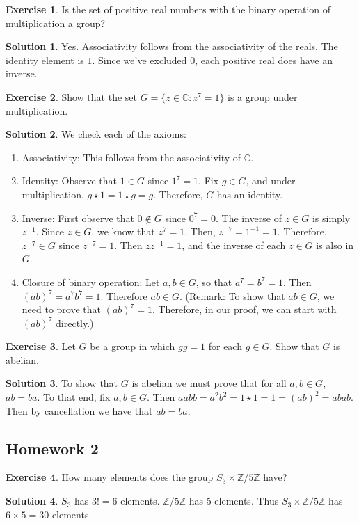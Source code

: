 \documentclass[12pt]{article}
\theoremstyle{definition}
\newcommand{\Z}{\mathbb{Z}}
\newtheorem{exercise}{\color{YellowOrange}Exercise}
\theoremstyle{definition}
\newtheorem{solution}{\color{Goldenrod}Solution}
\begin{document}
\begin{exercise}
Is the set of positive real numbers with the binary operation of multiplication a group?
\end{exercise}
\begin{solution}
Yes. Associativity follows from the associativity of the reals. The identity element is $1$. Since we've excluded $0$, each positive real does have an inverse.
\end{solution}

\begin{exercise}
Show that the set $G = \{z \in \mathbb{C}: z^7 = 1\}$ is a group under multiplication.
\end{exercise}
\begin{solution}
We check each of the axioms:
\begin{enumerate}
\item Associativity: This follows from the associativity of $\mathbb{C}$.
\item Identity: Observe that $1 \in G$ since $1^7 = 1$. Fix $g \in G$, and under multiplication, $g \star 1 = 1 \star g = g$. Therefore, $G$ has an identity.
\item Inverse: First observe that $0 \not\in G$ since $0^7 = 0$. The inverse of $z \in G$ is simply $z^{-1}$. Since $z \in G$, we know that $z^7 = 1$. Then, $z^{-7} = 1^{-1} = 1$. Therefore, $z^{-7} \in G$ since $z^{-7} = 1$. Then $z z^{-1} = 1$, and the inverse of each $z \in G$ is also in $G$.
\item Closure of binary operation: Let $a,b \in G$, so that $a^7 = b^7 = 1$. Then $(ab)^7 = a^7 b^7 = 1$. Therefore $ab \in G$. (Remark: To show that $ab \in G$, we need to prove that $(ab)^7 = 1$. Therefore, in our proof, we can start with $(ab)^7$ directly.)
\end{enumerate}
\end{solution}

\begin{exercise}
Let $G$ be a group in which $gg = 1$ for each $g \in G$. Show that $G$ is abelian.
\end{exercise}
\begin{solution}
To show that $G$ is abelian we must prove that for all $a,b \in G$, $ab = ba$. To that end, fix $a,b \in G$. Then $aabb = a^2 b^2 = 1 \star 1 = 1 = (ab)^2 = abab$. Then by cancellation we have that $ab = ba$.
\end{solution}


\subsection{Homework 2}
\begin{exercise}
How many elements does the group $S_3 \times \mathbb{Z}/5\mathbb{Z}$ have?
\end{exercise}
\begin{solution}
$S_3$ has $3! = 6$ elements. $\Z / 5 \Z$ has 5 elements. Thus $S_3 \times \mathbb{Z}/5\mathbb{Z}$ has $ 6 \times 5 = 30$ elements. 
\end{solution}
\end{document}
